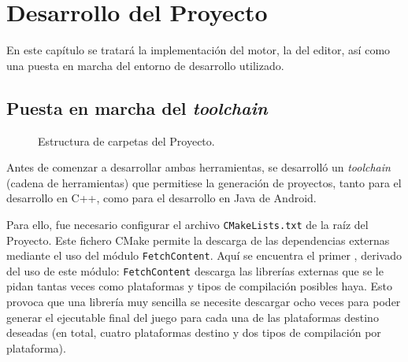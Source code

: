 \chapter{Desarrollo del Proyecto}
\label{cap:desarrollo}

\begin{resumen}
En este capítulo se tratará la implementación del motor, la del editor, así como una puesta en marcha del entorno de desarrollo utilizado.
\end{resumen}

\section{Puesta en marcha del \textit{toolchain}}
\begin{figure}[htbp]
    \caption{Estructura de carpetas del Proyecto.}
    \label{fig:estructuraproyecto}
\end{figure}

Antes de comenzar a desarrollar ambas herramientas, se desarrolló un \textit{toolchain} (cadena de herramientas) que permitiese la generación de proyectos, tanto para el desarrollo en C++, como para el desarrollo en Java de Android.

\smallskip

Para ello, fue necesario configurar el archivo \texttt{CMakeLists.txt} de la raíz del Proyecto. Este fichero CMake permite la descarga de las dependencias externas mediante el uso del módulo \texttt{FetchContent}. Aquí se encuentra el primer , derivado del uso de este módulo: \texttt{FetchContent} descarga las librerías externas que se le pidan tantas veces como plataformas y tipos de compilación posibles haya. Esto provoca que una librería muy sencilla se necesite descargar ocho veces para poder generar el ejecutable final del juego para cada una de las plataformas destino deseadas (en total, cuatro plataformas destino y dos tipos de compilación por plataforma). 

\smallskip

